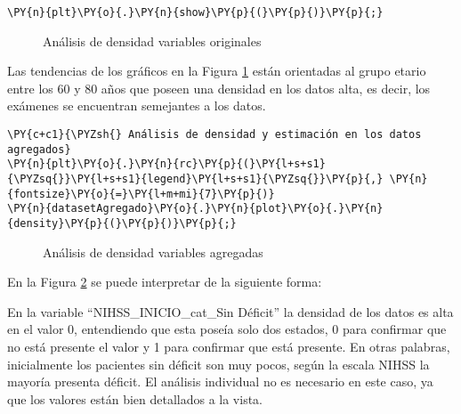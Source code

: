 \begin{tcolorbox}[breakable, size=fbox, boxrule=1pt, pad at break*=1mm,colback=cellbackground, colframe=cellborder]
\begin{Verbatim}[commandchars=\\\{\}]
\PY{n}{plt}\PY{o}{.}\PY{n}{show}\PY{p}{(}\PY{p}{)}\PY{p}{;}
\end{Verbatim}
\end{tcolorbox}


\begin{center}
    	\begin{figure}[H]
	\centering
	\caption{Análisis de densidad variables originales}
	\label{fig:advo}
	\end{figure}
\end{center}
    
    Las tendencias de los gráficos en la Figura \ref{fig:advo} están orientadas al grupo etario entre
los 60 y 80 años que poseen una densidad en los datos alta, es decir, los exámenes se encuentran semejantes a los datos.

    \begin{tcolorbox}[breakable, size=fbox, boxrule=1pt, pad at break*=1mm,colback=cellbackground, colframe=cellborder]
\begin{Verbatim}[commandchars=\\\{\}]
\PY{c+c1}{\PYZsh{} Análisis de densidad y estimación en los datos agregados}
\PY{n}{plt}\PY{o}{.}\PY{n}{rc}\PY{p}{(}\PY{l+s+s1}{\PYZsq{}}\PY{l+s+s1}{legend}\PY{l+s+s1}{\PYZsq{}}\PY{p}{,} \PY{n}{fontsize}\PY{o}{=}\PY{l+m+mi}{7}\PY{p}{)}
\PY{n}{datasetAgregado}\PY{o}{.}\PY{n}{plot}\PY{o}{.}\PY{n}{density}\PY{p}{(}\PY{p}{)}\PY{p}{;}
\end{Verbatim}
\end{tcolorbox}

\begin{center}
    	\begin{figure}[H]
	\centering
	\caption{Análisis de densidad variables agregadas}
	\label{fig:adva}
	\end{figure}
\end{center}
    
    En la Figura \ref{fig:adva} se puede interpretar de la siguiente forma: 
\par En la variable ``NIHSS\_INICIO\_cat\_Sin Déficit'' la densidad de los datos es alta en el valor 0, entendiendo que esta poseía solo dos estados, 0 para confirmar que no está presente el valor y 1 para confirmar que está presente. En otras palabras, inicialmente los pacientes sin déficit son muy pocos, según la escala NIHSS la mayoría presenta déficit. El análisis individual no es necesario en este caso, ya que los valores están bien detallados a la vista.

